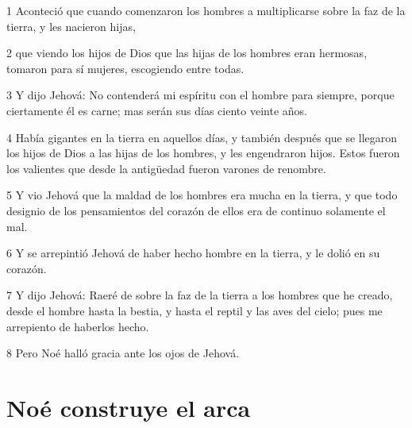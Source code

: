 \par 1 Aconteció que cuando comenzaron los hombres a multiplicarse sobre la faz de la tierra, y les nacieron hijas,
\par 2 que viendo los hijos de Dios que las hijas de los hombres eran hermosas, tomaron para sí mujeres, escogiendo entre todas.
\par 3 Y dijo Jehová: No contenderá mi espíritu con el hombre para siempre, porque ciertamente él es carne; mas serán sus días ciento veinte años.
\par 4 Había gigantes en la tierra en aquellos días, y también después que se llegaron los hijos de Dios a las hijas de los hombres, y les engendraron hijos. Estos fueron los valientes que desde la antigüedad fueron varones de renombre.
\par 5 Y vio Jehová que la maldad de los hombres era mucha en la tierra, y que todo designio de los pensamientos del corazón de ellos era de continuo solamente el mal.
\par 6 Y se arrepintió Jehová de haber hecho hombre en la tierra, y le dolió en su corazón.
\par 7 Y dijo Jehová: Raeré de sobre la faz de la tierra a los hombres que he creado, desde el hombre hasta la bestia, y hasta el reptil y las aves del cielo; pues me arrepiento de haberlos hecho.
\par 8 Pero Noé halló gracia ante los ojos de Jehová.

\section*{Noé construye el arca}


